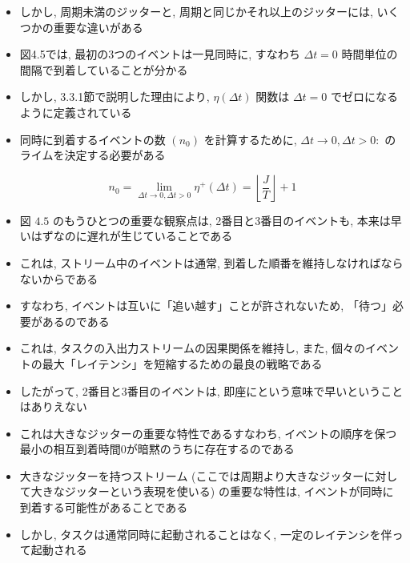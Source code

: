 \begin{frame}{}
    \begin{itemize}
        \item しかし, 周期未満のジッターと, 周期と同じかそれ以上のジッターには, いくつかの重要な違いがある
        \item 図4.5では, 最初の3つのイベントは一見同時に, すなわち $\Delta t=0$ 時間単位の間隔で到着していることが分かる
        \item しかし, 3.3.1節で説明した理由により, $\eta(\Delta t)$ 関数は $\Delta t=0$ でゼロになるように定義されている
        \item 同時に到着するイベントの数 $\left(n_{0}\right)$ を計算するために, $\Delta t \rightarrow 0, \Delta t>0:$ のライムを決定する必要がある

    \end{itemize}
    \begin{equation*}
        n_{0}=\lim _{\Delta t \rightarrow 0, \Delta t>0} \eta^{+}(\Delta t)=\left\lfloor\frac{J}{T}\right\rfloor+1
    \end{equation*}
\end{frame}


\begin{frame}{}
    \begin{itemize}
        \item 図 $4.5$ のもうひとつの重要な観察点は, 2番目と3番目のイベントも, 本来は早いはずなのに遅れが生じていることである
        \item これは, ストリーム中のイベントは通常, 到着した順番を維持しなければならないからである
        \item すなわち, イベントは互いに「追い越す」ことが許されないため, 「待つ」必要があるのである
        \item これは, タスクの入出力ストリームの因果関係を維持し, また, 個々のイベントの最大「レイテンシ」を短縮するための最良の戦略である
        \item したがって, 2番目と3番目のイベントは, 即座にという意味で早いということはありえない
        \item これは大きなジッターの重要な特性であるすなわち, イベントの順序を保つ最小の相互到着時間0が暗黙のうちに存在するのである
    \end{itemize}
\end{frame}

\begin{frame}{}
    \begin{itemize}
        \item 大きなジッターを持つストリーム (ここでは周期より大きなジッターに対して大きなジッターという表現を使いる) の重要な特性は, イベントが同時に到着する可能性があることである
        \item しかし, タスクは通常同時に起動されることはなく, 一定のレイテンシを伴って起動される
    \end{itemize}
\end{frame}

